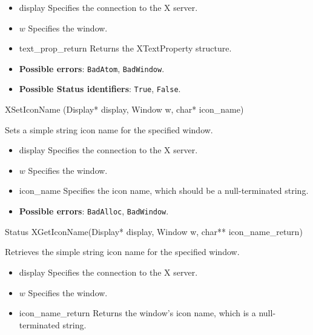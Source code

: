 \documentclass{report}
\begin{document}
\begin{itemize}
            \begin{itemize}
                \item display Specifies the connection to the X server.
                \item $w$ Specifies the window.
                \item text\_prop\_return Returns the XTextProperty structure.
            \end{itemize}

            \begin{itemize}
                \item \textbf{Possible errors}: \texttt{BadAtom}, \texttt{BadWindow}.
                \item \textbf{Possible Status identifiers}: \texttt{True}, \texttt{False}.
            \end{itemize}

            \begin{cppcode}
            XSetIconName (Display* display, Window w, char* icon_name)
            \end{cppcode}
            \bigbreak \noindent
            Sets a simple string icon name for the specified window.

            \begin{itemize}
                \item display Specifies the connection to the X server.
                \item $w$ Specifies the window.
                \item icon\_name Specifies the icon name, which should be a null-terminated string.
            \end{itemize}

            \begin{itemize}
                \item \textbf{Possible errors}: \texttt{BadAlloc}, \texttt{BadWindow}.
            \end{itemize}

            \begin{cppcode}
            Status XGetIconName(Display* display, Window w, char** icon_name_return)
            \end{cppcode}
            \bigbreak \noindent
            Retrieves the simple string icon name for the specified window.

            \begin{itemize}
                \item display Specifies the connection to the X server.
                \item $w$ Specifies the window.
                \item icon\_name\_return Returns the window’s icon name, which is a null-terminated string.
            \end{itemize}


\end{itemize}
\end{document}
